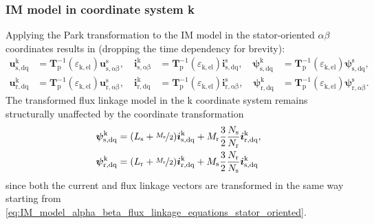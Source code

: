 \begin{frame}
	\frametitle{IM model in coordinate system k}
    Applying the Park transformation to the IM model in the stator-oriented $\alpha\beta$ coordinates results in (dropping the time dependency for brevity):
    \begin{equation}
        \begin{alignedat}{3}
            \bm{u}^\mathrm{k}_\mathrm{s,dq} &= \bm{T}^{-1}_\mathrm{p}(\varepsilon_\mathrm{k,el})\bm{u}^\mathrm{s}_\mathrm{s,\alpha\beta}, \quad \bm{i}^\mathrm{k}_\mathrm{s,\alpha\beta} &= \bm{T}^{-1}_\mathrm{p}(\varepsilon_\mathrm{k,el})\bm{i}^\mathrm{s}_\mathrm{s,dq}, \quad \bm{\psi}^\mathrm{k}_\mathrm{s,dq} &= \bm{T}^{-1}_\mathrm{p}(\varepsilon_\mathrm{k,el})\bm{\psi}^\mathrm{s}_\mathrm{s,dq},\\
            \bm{u}^\mathrm{k}_\mathrm{r,dq} &= \bm{T}^{-1}_\mathrm{p}(\varepsilon_\mathrm{k,el})\bm{u}^\mathrm{s}_\mathrm{r,\alpha\beta}, \quad \bm{i}^\mathrm{k}_\mathrm{r,dq} &= \bm{T}^{-1}_\mathrm{p}(\varepsilon_\mathrm{k,el})\bm{i}^\mathrm{s}_\mathrm{r,\alpha\beta}, \quad \bm{\psi}^\mathrm{k}_\mathrm{r,dq} &= \bm{T}^{-1}_\mathrm{p}(\varepsilon_\mathrm{k,el})\bm{\psi}^\mathrm{s}_\mathrm{r,\alpha\beta}.
        \end{alignedat}
    \end{equation}
    The transformed flux linkage model in the k coordinate system remains structurally unaffected by the coordinate transformation
    \begin{equation}
        \begin{split}
            \bm{\psi}^\mathrm{k}_\mathrm{s,dq} &= (L_\mathrm{s} +\nicefrac{M_\mathrm{s}}{2}) \bm{i}^\mathrm{k}_{\mathrm{s,dq}} +  M_{\mathrm{r}}\frac{3}{2}\frac{N_\mathrm{s}}{N_\mathrm{r}} \bm{i}^\mathrm{k}_{\mathrm{r,dq}},\\
            \bm{\psi}^\mathrm{k}_\mathrm{r,dq} &= (L_\mathrm{r} +\nicefrac{M_\mathrm{r}}{2}) \bm{i}^\mathrm{k}_{\mathrm{r,dq}} +  M_{\mathrm{s}}\frac{3}{2}\frac{N_\mathrm{r}}{N_\mathrm{s}} \bm{i}^\mathrm{k}_{\mathrm{s,dq}}
        \end{split}
    \end{equation}
    since both the current and flux linkage vectors are transformed in the same way starting from \eqref{eq:IM_model_alpha_beta_flux_linkage_equations_stator_oriented}.
\end{frame}

